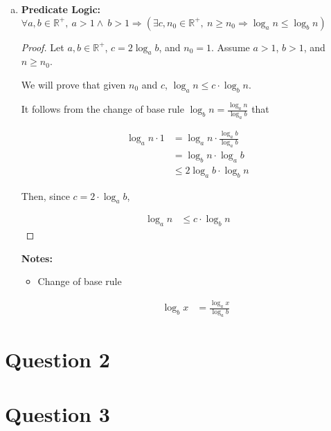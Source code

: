\documentclass[12pt]{article}
\begin{document}
\begin{enumerate}[a.]
\begin{itemize}
    \end{itemize}

    \item

    \textbf{Predicate Logic:} $\forall a,b \in \mathbb{R}^{+},\:a > 1 \land \:b > 1
    \Rightarrow (\exists c, n_0 \in \mathbb{R}^{+},\:n \geq n_0 \Rightarrow \log_a n \leq \log_b n)$

    \begin{proof}

        Let $a,b \in \mathbb{R}^{+}$, $c = 2 \log_a b$, and $n_0 = 1$. Assume $a > 1$,
        $b > 1$, and $n \geq n_0$.

        \bigskip

        We will prove that given $n_0$ and $c$, $\log_a n \leq c \cdot \log_b n$.

        \bigskip

        It follows from the change of base rule $\log_b n = \frac{\log_a n}{\log_a b}$
        that

        \setcounter{equation}{0}
        \begin{align}
            \log_a n \cdot 1 &= \log_a n \cdot \frac{\log_a b}{\log_a b}\\
            &= \log_b n \cdot \log_a b\\
            &\leq 2 \log_a b \cdot \log_b n
        \end{align}

        \bigskip

        Then, since $c = 2 \cdot \log_a b$,

        \begin{align}
            \log_a n &\leq c \cdot \log_b n
        \end{align}

    \end{proof}

    \textbf{Notes:}

    \begin{itemize}
        \item Change of base rule

        \begin{align}
            \log_b x &= \frac{\log_a x}{\log_a b}
        \end{align}

    \end{itemize}

\end{enumerate}

\section*{Question 2}

\section*{Question 3}
\end{document}
